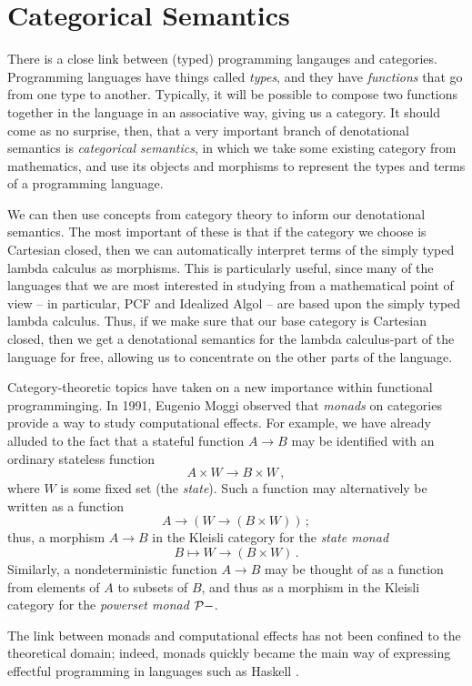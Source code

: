 \documentclass[11pt]{report}
\begin{document}
\section{Categorical Semantics}

There is a close link between (typed) programming langauges and categories.
Programming languages have things called \emph{types}, and they have \emph{functions} that go from one type to another. 
Typically, it will be possible to compose two functions together in the language in an associative way, giving us a category.
It should come as no surprise, then, that a very important branch of denotational semantics is \emph{categorical semantics}, in which we take some existing category from mathematics, and use its objects and morphisms to represent the types and terms of a programming language.

We can then use concepts from category theory to inform our denotational semantics. 
The most important of these is that if the category we choose is Cartesian closed, then we can automatically interpret terms of the simply typed lambda calculus as morphisms.
This is particularly useful, since many of the languages that we are most interested in studying from a mathematical point of view -- in particular, PCF and Idealized Algol -- are based upon the simply typed lambda calculus.
Thus, if we make sure that our base category is Cartesian closed, then we get a denotational semantics for the lambda calculus-part of the language for free, allowing us to concentrate on the other parts of the language.

Category-theoretic topics have taken on a new importance within functional programminging.
In 1991, Eugenio Moggi observed that \emph{monads} on categories provide a way to study computational effects. 
For example, we have already alluded to the fact that a stateful function $A \to B$ may be identified with an ordinary stateless function
\[
	A \times W \to B \times W\,,
	\]
where $W$ is some fixed set (the \emph{state}). 
Such a function may alternatively be written as a function
\[
	A \to (W \to (B \times W))\,;
	\]
thus, a morphism $A \to B$ in the Kleisli category for the \emph{state monad}
\[
	B \mapsto W \to (B \times W)\,.
	\]
Similarly, a nondeterministic function $A\to B$ may be thought of as a function from elements of $A$ to subsets of $B$, and thus as a morphism in the Kleisli category for the \emph{powerset monad} $\mathcal P-$.

The link between monads and computational effects has not been confined to the theoretical domain; indeed, monads quickly became the main way of expressing effectful programming in languages such as Haskell \cite{Haskell}.
\end{document}
